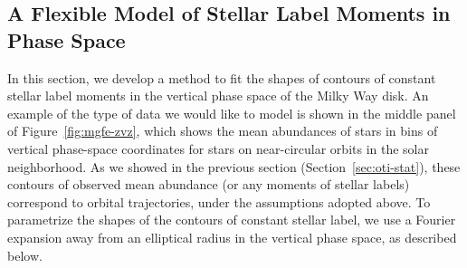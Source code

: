
\subsection{A Flexible Model of Stellar Label Moments in Phase Space}
\label{sec:oti-fourier}


In this section, we develop a method to fit the shapes of contours of constant stellar
label moments in the vertical phase space of the Milky Way disk.
An example of the type of data we would like to model is shown in the middle panel of
Figure~\ref{fig:mgfe-zvz}, which shows the mean  abundances of stars in
bins of vertical phase-space coordinates for stars on near-circular orbits in the solar
neighborhood.
As we showed in the previous section (Section~\ref{sec:oti-stat}), these contours of
observed mean  abundance (or any moments of stellar labels) correspond to
orbital trajectories, under the assumptions adopted above.
To parametrize the shapes of the contours of constant stellar label, we use a Fourier
expansion away from an elliptical radius in the vertical phase space, as described
below.

